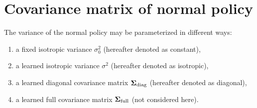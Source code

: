 



%

\section{Covariance matrix of normal policy}

The variance of the normal policy may be parameterized in different ways:

\begin{enumerate}
	\item a fixed isotropic variance $\sigma_0^2$ (hereafter denoted as constant),
	\item a learned isotropic variance $\sigma^2$ (hereafter denoted as isotropic),
	\item a learned diagonal covariance matrix $\bm{\Sigma}_\text{diag}$ (hereafter denoted as diagonal),
	\item a learned full covariance matrix $\bm{\Sigma}_\text{full}$ (not considered here).
\end{enumerate}

